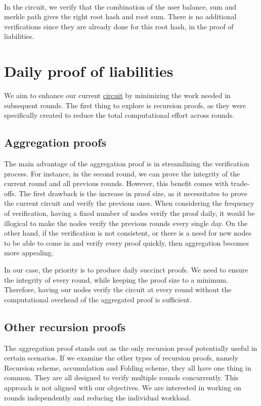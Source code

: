 \paragraph{}
In the circuit, we verify that the combination of the user balance, sum and merkle path gives the right root hash and root sum. There is no additional
verifications since they are already done for this root hash, in the proof of liabilities.

\section{Daily proof of liabilities}
We aim to enhance our current \hyperref[subsec:pl]{circuit} by minimizing the work needed in subsequent rounds.
The first thing to explore is recursion proofs, as they were specifically created to reduce the total computational effort across rounds.

\subsection{Aggregation proofs}
The main advantage of the aggregation proof is in streamlining the verification process. For instance, in the second round, we can prove the integrity of the current round and all previous rounds.
However, this benefit comes with trade-offs. The first drawback is the increase in proof size, as it necessitates to prove the current circuit and verify the previous ones.
When considering the frequency of verification, having a fixed number of nodes verify the proof daily, it would be illogical to make the nodes verify the previous rounds every single day.
On the other hand, if the verification is not consistent, or there is a need for new nodes to be able to come in and verify every proof quickly, then aggregation becomes more appealing.

In our case, the priority is to produce daily succinct proofs. We need to ensure the integrity of every round, while keeping the proof size to a minimum.
Therefore, having our nodes verify the circuit at every round without the computational overhead of the aggregated proof is sufficient.

\subsection{Other recursion proofs}
The aggregation proof stands out as the only recursion proof potentially useful in certain scenarios.
If we examine the other types of recursion proofs, namely Recursion scheme, accumulation and Folding scheme, they all have one thing in common.
They are all designed to verify multiple rounds concurrently.
This approach is not aligned with our objectives. We are interested in working on rounds independently and reducing the individual workload.

